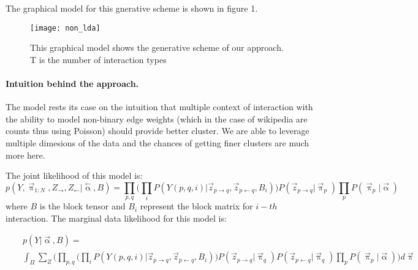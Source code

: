 The graphical model for this gnerative scheme is shown in figure 1.

\begin{figure}
\begin{center}
\texttt{[image: non\_lda]}
\label{fig:gmodel}
\caption{This graphical model shows the generative scheme of our approach. T is the number of interaction types}
\end{center}
\end{figure}



\paragraph{Intuition behind the approach.} The model rests its case on the intuition that multiple context of 
interaction with the ability to model non-binary edge weights (which in the case of wikipedia are counts thus 
using Poisson) should provide better cluster. We are able to leverage multiple dimesions of the data and the 
chances of getting finer clusters are much more here. 

The joint likelihood of this model is:
\begin{equation}
p(Y, \overset{\rightarrow}{\uppi}_{1:N}, Z_{\rightarrow},
Z_{\leftarrow}|\overset{\leftarrow}{\upalpha}, B) =
\prod_{p,q}(\prod_{i}{P(Y(p,q,i)|\overset{\rightarrow}{z}_{p \rightarrow q},
\overset{\rightarrow}{z}_{p \leftarrow q}, B_{i}))P(\overset{\rightarrow} {z}_{p
\rightarrow q}|\overset{\rightarrow}{\uppi}_{p})\prod_{p}
{P(\overset{\rightarrow}{\uppi}_{p}|\overset{\rightarrow}{\upalpha})}}
\end{equation}  
where $B$ is the block tensor and $B_i$ represent the block matrix for $i-th$
interaction. The marginal data likelihood for this model is:

\begin{eqnarray}
&&p(Y|\overset{\rightarrow}{\upalpha}, B) = \nonumber\\
&&\int_{\Pi}{\sum_{Z}{\bigg( \prod_{p,q}(\prod_{i}{P(Y(p,q,i)|
\overset{\rightarrow}{z}_{p \rightarrow q}, 
\overset{\rightarrow}{z}_{p \leftarrow q}, B_i)) P(\overset{\rightarrow}{z}_{p
\rightarrow q} | \overset{\rightarrow}{\uppi}_{q}) P(\overset{\rightarrow}{z}_{p
\leftarrow q}|\overset{\rightarrow}{\uppi}_{q})\prod_{p}{P(\overset{
\rightarrow}{\uppi}_{p}|\overset{\rightarrow}{\upalpha})}} \bigg)
d\overset{\rightarrow}{\uppi}}} \nonumber\\
\end{eqnarray} 

